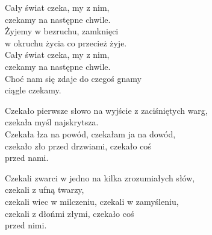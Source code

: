 \begin{text}
    Cały świat czeka, my z nim,\\
    czekamy na następne chwile.\\
    Żyjemy w bezruchu, zamknięci\\
    w okruchu życia co przecież żyje.\\
    Cały świat czeka, my z nim,\\
    czekamy na następne chwile.\\
    Choć nam się zdaje do czegoś gnamy\\
    ciągle czekamy.

    Czekało pierwsze słowo na wyjście z zaciśniętych warg,\\
    czekała myśl najskrytsza.\\
    Czekała łza na powód, czekałam ja na dowód,\\
    czekało zło przed drzwiami, czekało coś\\
    przed nami.

    Czekali zwarci w jedno na kilka zrozumiałych słów,\\
    czekali z ufną twarzy,\\
    czekali wiec w milczeniu, czekali w zamyśleniu,\\
    czekali z dłońmi złymi, czekało coś\\
    przed nimi.
\end{text}
\begin{chord}

\end{chord}